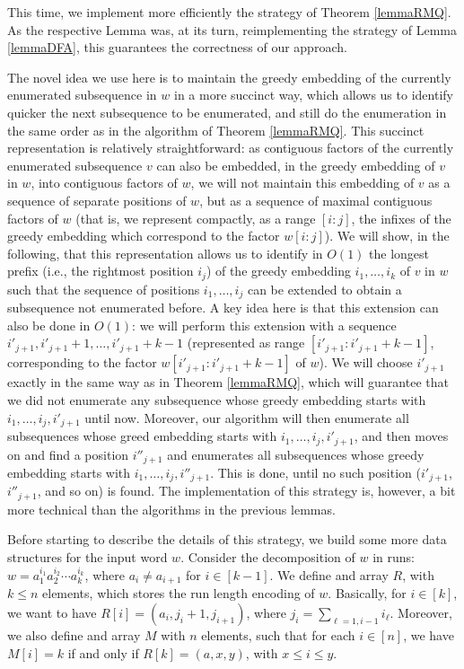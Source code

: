 \documentclass[10pt,a4paper]{amsart}
\makeatletter
\theoremstyle{plain}
\theoremstyle{definition}
\renewenvironment{proof}[1][\proofname]{\par
  \pushQED{}%
  \normalfont \topsep6\p@\@plus6\p@\relax
  \trivlist
  \item[\hskip\labelsep\itshape #1\@addpunct{.}]\ignorespaces
}{%
  \popQED\endtrivlist\@endpefalse
}
\makeatother
\begin{document}
\begin{proof}
This time, we implement more efficiently the strategy of Theorem \ref{lemmaRMQ}. As the respective Lemma was, at its turn, reimplementing the strategy of Lemma \ref{lemmaDFA}, this guarantees the correctness of our approach. 

The novel idea we use here is to maintain the greedy embedding of the currently enumerated subsequence in $w$ in a more succinct way, which allows us to identify quicker the next subsequence to be enumerated, and still do the enumeration in the same order as in the algorithm of Theorem \ref{lemmaRMQ}. This succinct representation is relatively straightforward: as contiguous factors of the currently enumerated subsequence $v$ can also be embedded, in the greedy embedding of $v$ in $w$, into contiguous factors of $w$, we will not maintain this embedding of $v$ as a sequence of separate positions of $w$, but as a sequence of maximal contiguous factors of $w$ (that is, we represent compactly, as a range $[i:j]$, the infixes of the greedy embedding which correspond to the factor $w[i:j]$). We will show, in the following, that this representation allows us to identify in $O(1)$ the longest prefix (i.e., the rightmost position $i_j$) of the greedy embedding $i_1,\ldots, i_k$ of $v$ in $w$ such that the sequence of positions $i_1,\ldots, i_j$ can be extended to obtain a subsequence not enumerated before. A key idea here is that this extension can also be done in $O(1)$: we will perform this extension with a sequence $i'_{j+1},i'_{j+1}+1,\ldots, i'_{j+1}+k-1$ (represented as range $[i'_{j+1}: i'_{j+1}+k-1]$, corresponding to the factor $w[i'_{j+1}: i'_{j+1}+k-1]$ of $w$). We will choose $i'_{j+1}$ exactly in the same way as in Theorem \ref{lemmaRMQ}, which will guarantee that we did not enumerate any subsequence whose greedy embedding starts with $i_1,\ldots, i_j, i'_{j+1}$ until now. Moreover, our algorithm will then enumerate all subsequences whose greed embedding starts with $i_1,\ldots, i_j, i'_{j+1}$, and then moves on and find a position $i''_{j+1}$ and enumerates all subsequences whose greedy embedding starts with $i_1,\ldots, i_j, i''_{j+1}$. This is done, until no such position ($i'_{j+1}$, $i''_{j+1}$, and so on) is found. The implementation of this strategy is, however, a bit more technical than the algorithms in the previous lemmas.

Before starting to describe the details of this strategy, we build some more data structures for the input word $w$. Consider the decomposition of $w$ in runs: $w=a_1^{i_1}a_2^{i_2}\cdots a_k^{i_k}$, where $a_i\neq a_{i+1}$ for $i\in [k-1]$. We define and array $R$, with $k\leq n$ elements, which stores the run length encoding of $w$. Basically, for $i\in [k]$, we want to have $R[i]=(a_i,j_i+1,j_{i+1})$, where $j_i=\sum_{\ell=1,i-1} i_\ell$. Moreover, we also define and array $M$ with $n$ elements, such that for each $i\in [n]$, we have $M[i]=k$ if and only if $R[k]=(a,x,y)$, with $x\leq i\leq y$. 


\end{proof}
\end{document}
